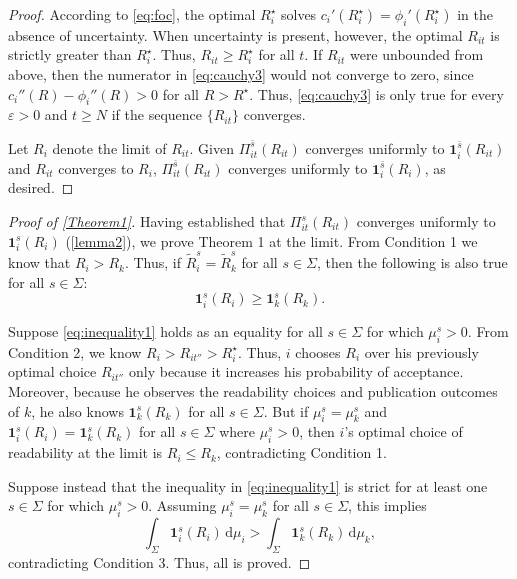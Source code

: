 \begin{proof}
	According to \autoref{eq:foc}, the optimal $R_i^\star$ solves $c_i'(R_i^\star)=\phi_i'(R_i^\star)$ in the absence of uncertainty. When uncertainty is present, however, the optimal $R_{it}$ is strictly greater than $R_i^\star$. Thus, $R_{it}\ge R_i^\star$ for all $t$. If $R_{it}$ were unbounded from above, then the numerator in \autoref{eq:cauchy3} would not converge to zero, since $c_i''(R)-\phi_i''(R)>0$ for all $R>R^\star$. Thus, \autoref{eq:cauchy3} is only true for every $\varepsilon>0$ and $t\ge N$ if the sequence $\{R_{it}\}$ converges.
	
	Let $R_i$ denote the limit of $R_{it}$. Given $\Pi_{it}^{\bar s}(R_{it})$ converges uniformly to $\bm1_i^{\bar s}(R_{it})$ and $R_{it}$ converges to $R_i$, $\Pi_{it}^{\bar s}(R_{it})$ converges uniformly to $\bm1_i^{\bar s}(R_i)$, as desired.
\end{proof}

\begin{proof}[Proof of \autoref{Theorem1}]
	Having established that $\Pi_{it}^s(R_{it})$ converges uniformly to $\bm1_i^s(R_i)$ (\autoref{lemma2}), we prove Theorem 1 at the limit. From Condition 1 we know that $R_i>R_k$. Thus, if $\widetilde R_i^s=\widetilde R_k^s$ for all $s\in\Sigma$, then the following is also true for all $s\in\Sigma$:
	\begin{equation}
		\bm1_i^s(R_i)\ge\bm1_k^s(R_k).
		\label{eq:inequality1}
	\end{equation}
	
	Suppose \autoref{eq:inequality1} holds as an equality for all $s\in\Sigma$ for which $\mu_i^s>0$. From Condition 2, we know $R_i>R_{it''}>R_i^\star$. Thus, $i$ chooses $R_i$ over his previously optimal choice $R_{it''}$ only because it increases his probability of acceptance. Moreover, because he observes the readability choices and publication outcomes of $k$, he also knows $\bm1_k^s(R_k)$ for all $s\in\Sigma$. But if $\mu_i^s=\mu_k^s$ and $\bm1_i^s(R_i)=\bm1_k^s(R_k)$ for all $s\in\Sigma$ where $\mu_i^s>0$, then $i$'s optimal choice of readability at the limit is $R_i\le R_k$, contradicting Condition 1.
	
	Suppose instead that the inequality in \autoref{eq:inequality1} is strict for at least one $s\in\Sigma$ for which $\mu_i^s>0$. Assuming $\mu_i^s=\mu_k^s$ for all $s\in\Sigma$, this implies
	\begin{equation}
		\int_\Sigma\!\bm1_i^s(R_i)\,\mathrm d\mu_i>\int_\Sigma\!\bm1_k^s(R_k)\,\mathrm d\mu_k,
		\label{eq:inequality2}
	\end{equation}
	contradicting Condition 3. Thus, all is proved.
\end{proof}

